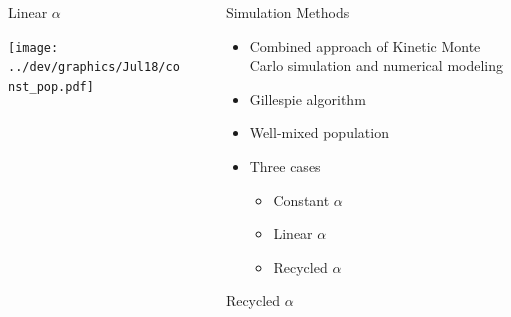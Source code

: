 \documentclass[final]{beamer}
\newlength{\sepwid}
\newlength{\onecolwid}
\begin{document}
\begin{frame}[t]
\begin{columns}[t]
\begin{column}{\onecolwid}
\begin{alertblock}{Linear $\alpha$}
\begin{center}
      \texttt{[image: ../dev/graphics/Jul18/const\_pop.pdf]}
    \end{center}

    \end{alertblock}
\end{column}
\begin{column}{\sepwid}\end{column} %


\begin{column}{\onecolwid}





  \begin{block}{Simulation Methods}

  \begin{itemize}
    \item Combined approach of Kinetic Monte Carlo simulation and numerical modeling
    \item Gillespie algorithm
    \item Well-mixed population
    \item Three cases
    \begin{itemize}
      \item Constant $\alpha$
      \item Linear $\alpha$
      \item Recycled $\alpha$
    \end{itemize}
  \end{itemize}

  \end{block}



      \begin{alertblock}{Recycled $\alpha$}


\end{alertblock}
\end{column}
\end{columns}
\end{frame}
\end{document}
